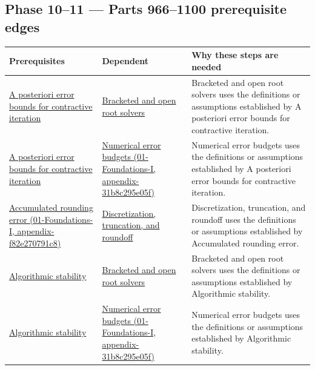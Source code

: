 \subsection{Phase 10--11 --- Parts 966--1100 prerequisite edges}\label{phase-1011-parts-9661100-prerequisite-edges}

{\def\LTcaptype{none} %
\begin{longtable}[]{@{}
  >{\raggedright\arraybackslash}p{}
  >{\raggedright\arraybackslash}p{}
  >{\raggedright\arraybackslash}p{}@{}}
\toprule\noalign{}
\begin{minipage}[b]{\linewidth}\raggedright
Prerequisites
\end{minipage} & \begin{minipage}[b]{\linewidth}\raggedright
Dependent
\end{minipage} & \begin{minipage}[b]{\linewidth}\raggedright
Why these steps are needed
\end{minipage} \\
\midrule\noalign{}
\endhead
\bottomrule\noalign{}
\endlastfoot
\hyperref[appendix-d83b0ad1be7f]{A posteriori error bounds for contractive iteration} & \hyperref[appendix-f63eb850796d]{Bracketed and open root solvers} & Bracketed and open root solvers uses the definitions or assumptions established by A posteriori error bounds for contractive iteration. \\
\hyperref[appendix-d83b0ad1be7f]{A posteriori error bounds for contractive iteration} & \href{}{Numerical error budgets (01-Foundations-I, appendix-31b8c295e05f)} & Numerical error budgets uses the definitions or assumptions established by A posteriori error bounds for contractive iteration. \\
\href{}{Accumulated rounding error (01-Foundations-I, appendix-f82e270791c8)} & \hyperref[appendix-6b0648b2b8e8]{Discretization, truncation, and roundoff} & Discretization, truncation, and roundoff uses the definitions or assumptions established by Accumulated rounding error. \\
\hyperref[appendix-aa2bf0d79639]{Algorithmic stability} & \hyperref[appendix-f63eb850796d]{Bracketed and open root solvers} & Bracketed and open root solvers uses the definitions or assumptions established by Algorithmic stability. \\
\hyperref[appendix-aa2bf0d79639]{Algorithmic stability} & \href{}{Numerical error budgets (01-Foundations-I, appendix-31b8c295e05f)} & Numerical error budgets uses the definitions or assumptions established by Algorithmic stability. \\

\end{longtable}}
